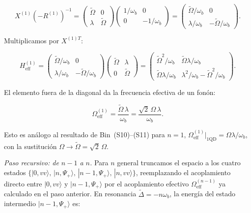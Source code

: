 \documentclass[12pt]{article}
\begin{document}
	\begin{equation}
		X^{(1)}\!\left(-R^{(1)}\right)^{-1}
		= \begin{pmatrix} \widetilde{\Omega} & 0 \\ \lambda & \widetilde{\Omega}
		\end{pmatrix}
		\begin{pmatrix} 1/\omega_b & 0 \\ 0 & -1/\omega_b \end{pmatrix}
		= \begin{pmatrix}
			\widetilde{\Omega}/\omega_b & 0 \\
			\lambda/\omega_b & -\widetilde{\Omega}/\omega_b
		\end{pmatrix}.
	\end{equation}
	
	\noindent
	Multiplicamos por $X^{(1)T}$:
	
	\begin{equation}
		H_{\mathrm{eff}}^{(1)}
		= \begin{pmatrix}
			\widetilde{\Omega}/\omega_b & 0 \\[4pt]
			\lambda/\omega_b & -\widetilde{\Omega}/\omega_b
		\end{pmatrix}
		\begin{pmatrix} \widetilde{\Omega} & \lambda \\ 0 & \widetilde{\Omega}
		\end{pmatrix}
		= \begin{pmatrix}
			\widetilde{\Omega}^2/\omega_b &
			\widetilde{\Omega}\lambda/\omega_b \\[4pt]
			\widetilde{\Omega}\lambda/\omega_b &
			\lambda^2/\omega_b - \widetilde{\Omega}^2/\omega_b
		\end{pmatrix}.
	\end{equation}
	
	\noindent
	El elemento fuera de la diagonal da la frecuencia efectiva de un fon\'on:
	
	\begin{equation}
		\Omega_{\mathrm{eff}}^{(1)} = \frac{\widetilde{\Omega}\,\lambda}{\omega_b}
		= \frac{\sqrt{2}\,\Omega\,\lambda}{\omega_b}.
		\label{eq:Oeff_1}
	\end{equation}
	
	\noindent
	Esto es an\'alogo al resultado de Bin~(S10)--(S11) para $n=1$,
	$\Omega_{\mathrm{eff}}^{(1)}\big|_{\mathrm{1QD}} = \Omega\lambda/\omega_b$,
	con la sustituci\'on $\Omega \to \widetilde{\Omega} = \sqrt{2}\,\Omega$.
	
	\medskip
	\noindent
	\textit{Paso recursivo: de $n-1$ a $n$.}
	Para $n$ general truncamos el espacio a los cuatro estados
	$\{|0,vv\rangle,\, |n,\Psi_+\rangle,\, |n-1,\Psi_+\rangle,\,
	|n,vv\rangle\}$, reemplazando el acoplamiento directo entre
	$|0,vv\rangle$ y $|n-1,\Psi_+\rangle$ por el acoplamiento efectivo
	$\Omega_{\mathrm{eff}}^{(n-1)}$ ya calculado en el paso anterior.
	En resonancia $\widetilde{\Delta} = -n\omega_b$, la energ\'ia del estado
	intermedio $|n-1, \Psi_+\rangle$ es:
	
\end{document}

